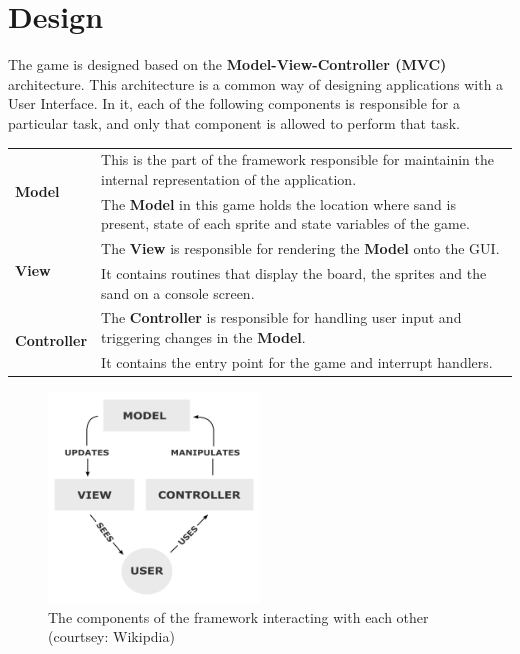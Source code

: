 \section{Design}

The game is designed based on the \textbf{Model-View-Controller (MVC)} architecture.
This architecture is a common way of designing applications with a User Interface.
In it, each of the following components is responsible for a particular task, and only that component is allowed to perform that task.

\begin{table}[H]
  \centering
  \bgroup
  \def\arraystretch{1.5}
  \begin{tabularx}{\textwidth}{|p{3cm}|X|}
    \hline
    \multirow{2}{*}{\textbf{Model}}  & This is the part of the framework responsible for maintainin the internal representation of the application.                      \\
                            & The \textbf{Model} in this game holds the location where sand is present, state of each sprite and state variables of the game. \\
    \hline

    \multirow{2}{*}{\textbf{View}}   & The \textbf{View} is responsible for rendering the \textbf{Model} onto the GUI. \\
                            & It contains routines that display the board, the sprites and the sand on a console screen.                                        \\
    \hline

    \multirow{2}{*}{\textbf{Controller}} & The \textbf{Controller} is responsible for handling user input and triggering changes in the \textbf{Model}.\\
                            & It contains the entry point for the game and interrupt handlers. \\
    \hline
  \end{tabularx}
  \egroup
\end{table}


\begin{figure}[H]
  \centering
  \includegraphics[width=0.5\textwidth]{images/mvc-process.png}
  \caption{\label{fig:mvc-process} The components of the framework interacting with each other (courtsey: Wikipdia)}
\end{figure}







